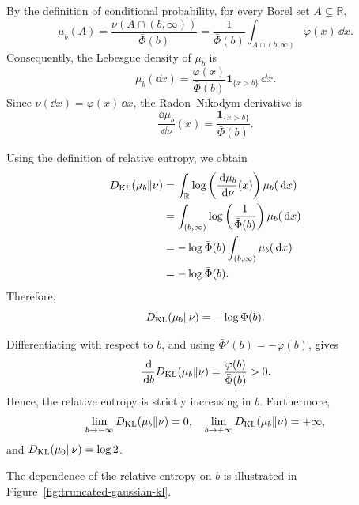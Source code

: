 \documentclass[12pt,a4paper,oneside]{book}
\begin{document}
\begin{example}
\begin{solution}
By the definition of conditional probability, for every Borel set $A\subseteq\mathbb R$,
\begin{equation*}
    \mu_b(A) = \frac{\nu(A\cap(b,\infty))}{\bar\Phi(b)}
    = \frac{1}{\bar\Phi(b)}\int_{A\cap(b,\infty)}\varphi(x)\,\dd x.
\end{equation*}
Consequently, the Lebesgue density of $\mu_b$ is
\begin{equation*}
    \mu_b(\dd x) = \frac{\varphi(x)}{\bar\Phi(b)} \mathbf 1_{\{x>b\}}\,\dd x.
\end{equation*}
Since $\nu(\dd x)=\varphi(x)\,\dd x$, the Radon--Nikodym derivative is
\begin{equation*}
    \frac{\dd\mu_b}{\dd\nu}(x) = \frac{\mathbf 1_{\{x>b\}}}{\bar\Phi(b)}.
\end{equation*}

Using the definition of relative entropy, we obtain
\begin{equation*}
\begin{aligned}
    D_{\mathrm{KL}}(\mu_b\Vert\nu) &= \int_{\mathbb R} \log\left(\frac{\,\mathrm{d}\mu_b}{\,\mathrm{d}\nu}(x)\right) \mu_b(\,\mathrm{d} x)\\
    &= \int_{(b,\infty)} \log\left(\frac{1}{\bar\Phi(b)}\right) \mu_b(\,\mathrm{d} x)\\
    &= -\log\bar\Phi(b) \int_{(b,\infty)}\mu_b(\,\mathrm{d} x)\\
    &= -\log\bar\Phi(b).
\end{aligned}
\end{equation*}
Therefore,
\begin{equation}
    D_{\mathrm{KL}}(\mu_b\Vert\nu) = -\log\bar\Phi(b).
    \label{eq:truncated-gaussian-kl}
\end{equation}

Differentiating with respect to $b$, and using $\bar\Phi'(b)=-\varphi(b)$, gives
\begin{equation*}
    \frac{\,\mathrm{d}}{\,\mathrm{d} b}D_{\mathrm{KL}}(\mu_b\Vert\nu) = \frac{\varphi(b)}{\bar\Phi(b)}>0.
\end{equation*}
Hence, the relative entropy is strictly increasing in $b$. Furthermore,
\begin{equation*}
    \lim_{b\to-\infty}D_{\mathrm{KL}}(\mu_b\Vert\nu)=0, \quad
    \lim_{b\to+\infty}D_{\mathrm{KL}}(\mu_b\Vert\nu)=+\infty,
\end{equation*}
and $D_{\mathrm{KL}}(\mu_0\Vert\nu)=\log 2$.

The dependence of the relative entropy on $b$ is illustrated in Figure~\ref{fig:truncated-gaussian-kl}.


\end{solution}
\end{example}
\end{document}
